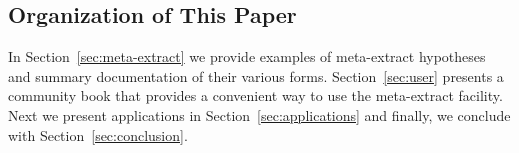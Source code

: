 \subsection{Organization of This Paper}

In Section~\ref{sec:meta-extract} we provide examples of meta-extract
hypotheses and summary documentation of their various forms.
Section~\ref{sec:user} presents a community book that
provides a convenient way to use the meta-extract facility.  Next we
present applications in Section~\ref{sec:applications} and finally, we
conclude with Section~\ref{sec:conclusion}.
